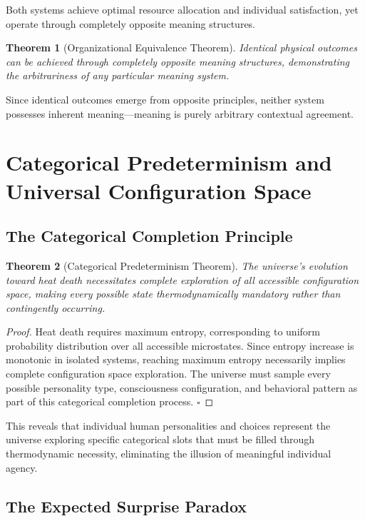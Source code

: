 \documentclass[12pt,a4paper]{article}
\newtheorem{theorem}{Theorem}
\begin{document}
Both systems achieve optimal resource allocation and individual satisfaction, yet operate through completely opposite meaning structures.

\begin{theorem}[Organizational Equivalence Theorem]
Identical physical outcomes can be achieved through completely opposite meaning structures, demonstrating the arbitrariness of any particular meaning system.
\end{theorem}

Since identical outcomes emerge from opposite principles, neither system possesses inherent meaning—meaning is purely arbitrary contextual agreement.

\section{Categorical Predeterminism and Universal Configuration Space}

\subsection{The Categorical Completion Principle}

\begin{theorem}[Categorical Predeterminism Theorem]
The universe's evolution toward heat death necessitates complete exploration of all accessible configuration space, making every possible state thermodynamically mandatory rather than contingently occurring.
\end{theorem}

\begin{proof}
Heat death requires maximum entropy, corresponding to uniform probability distribution over all accessible microstates. Since entropy increase is monotonic in isolated systems, reaching maximum entropy necessarily implies complete configuration space exploration. The universe must sample every possible personality type, consciousness configuration, and behavioral pattern as part of this categorical completion process. $\square$
\end{proof}

This reveals that individual human personalities and choices represent the universe exploring specific categorical slots that must be filled through thermodynamic necessity, eliminating the illusion of meaningful individual agency.

\subsection{The Expected Surprise Paradox}
\end{document}
